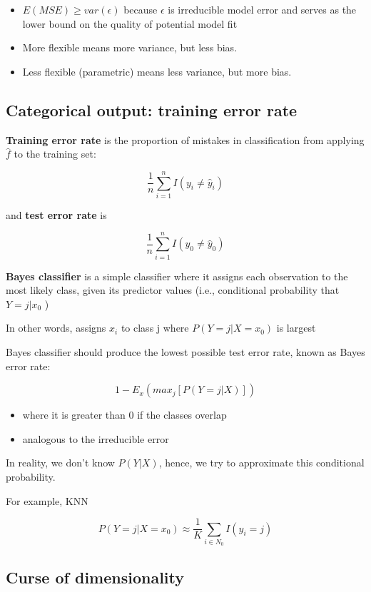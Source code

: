 \documentclass[
]{book}
\begin{document}
\begin{itemize}
\item
  \(E(MSE) \ge var(\epsilon)\) because \(\epsilon\) is irreducible model error and serves as the lower bound on the quality of potential model fit
\item
  More flexible means more variance, but less bias.
\item
  Less flexible (parametric) means less variance, but more bias.
\end{itemize}

\hypertarget{categorical-output-training-error-rate}{%
\subsection{Categorical output: training error rate}\label{categorical-output-training-error-rate}}

\textbf{Training error rate} is the proportion of mistakes in classification from applying \(\hat{f}\) to the training set:

\[
\frac{1}{n} \sum_{i=1}^n I(y_i \neq \hat{y}_i)
\]

and \textbf{test error rate} is

\[
\frac{1}{n} \sum_{i=1}^n I(y_0 \neq \hat{y}_0)
\]

\textbf{Bayes classifier} is a simple classifier where it assigns each observation to the most likely class, given its predictor values (i.e., conditional probability that \(Y = j | x_0\) )

In other words, assigns \(x_i\) to class j where \(P(Y=j | X=x_0)\) is largest

Bayes classifier should produce the lowest possible test error rate, known as Bayes error rate:

\[
1 - E_x(max_j [P(Y = j |X)])
\]

\begin{itemize}
\item
  where it is greater than 0 if the classes overlap
\item
  analogous to the irreducible error
\end{itemize}

In reality, we don't know \(P(Y|X)\), hence, we try to approximate this conditional probability.

For example, KNN

\[
P(Y =j |X = x_0 ) \approx \frac{1}{K}\sum_{i \in N_0} I(y_i = j)
\]

\hypertarget{curse-of-dimensionality}{%
\subsection{Curse of dimensionality}\label{curse-of-dimensionality}}
\end{document}
